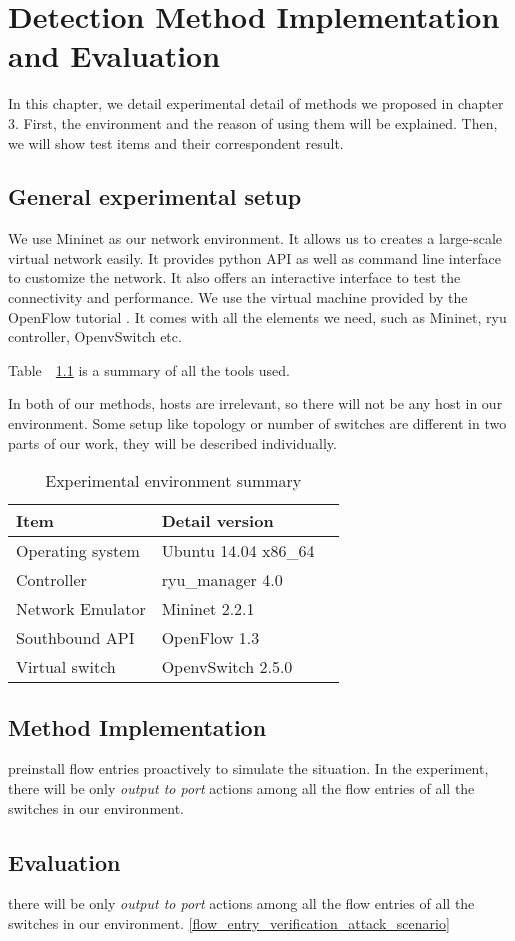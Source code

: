 \chapter{Detection Method Implementation and Evaluation}
In this chapter, we detail experimental detail of methods we proposed in chapter 3. First, the environment and the reason of using them will be explained. Then, we will show test items and their correspondent result.

\section{General experimental setup}
We use Mininet as our network environment. It allows us to creates a large-scale virtual network easily. 
It provides python API as well as command line interface to customize the network. It also offers an interactive interface to test the connectivity and performance. We use the virtual machine provided by the OpenFlow tutorial \cite{OFT}. It comes with all the elements we need, such as Mininet, ryu controller, OpenvSwitch etc.

Table~~\ref{table:Experiment_table} is a summary of all the tools used. 

In both of our methods, hosts are irrelevant, so there will not be any host in our environment. Some setup like topology or number of switches are different in two parts of our work, they will be described individually.

\begin{table}[H]
\centering
\caption{Experimental environment summary}
\begin{tabular}{|l|p{4cm}|p{4.5cm}}
\hline Item & Detail version \\
\hline Operating system & Ubuntu 14.04 x86\_64 \\
\hline Controller & ryu\_manager 4.0 \\
\hline Network Emulator & Mininet 2.2.1\\
\hline Southbound API & OpenFlow 1.3 \\
\hline Virtual switch & OpenvSwitch 2.5.0 \\
\hline 
\end{tabular}
\label{table:Experiment_table}
\end{table}


\section{Method Implementation}
preinstall flow entries proactively to simulate the situation. 
In the experiment, there will be only \textit{output to port} actions among all the flow entries of all the switches in our environment. 
\subsection{}



\section{Evaluation}


there will be only \textit{output to port} actions among all the flow entries of all the switches in our environment. \ref{flow_entry_verification_attack_scenario} 